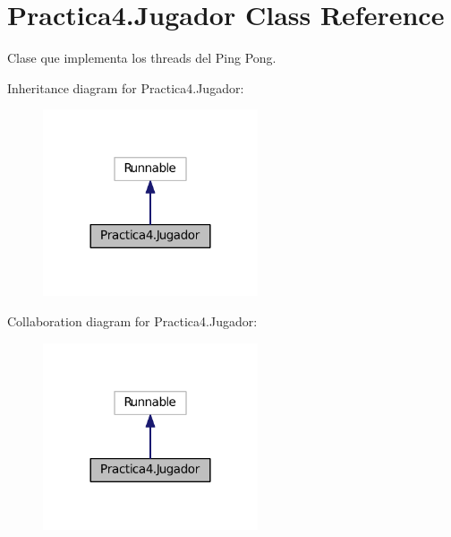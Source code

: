 \hypertarget{class_practica4_1_1_jugador}{}\section{Practica4.\+Jugador Class Reference}
\label{class_practica4_1_1_jugador}


Clase que implementa los threads del Ping Pong.  




Inheritance diagram for Practica4.\+Jugador\+:
\nopagebreak
\begin{figure}[H]
\begin{center}
\leavevmode
\includegraphics[width=180pt]{class_practica4_1_1_jugador__inherit__graph}
\end{center}
\end{figure}


Collaboration diagram for Practica4.\+Jugador\+:
\nopagebreak
\begin{figure}[H]
\begin{center}
\leavevmode
\includegraphics[width=180pt]{class_practica4_1_1_jugador__coll__graph}
\end{center}
\end{figure}

